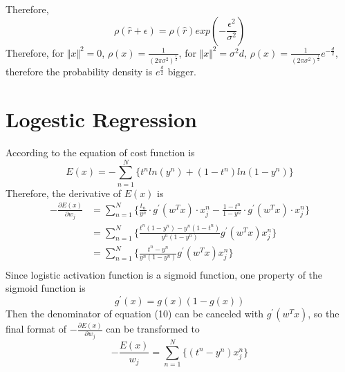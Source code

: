 \documentclass{article} %
\begin{document}
Therefore,
\begin{equation}
    \rho(\hat{r}+\epsilon) = \rho(\hat{r})exp(-\frac{\epsilon^2}{\sigma^2})
\end{equation}
Therefore, for $\Vert x \Vert^2=0$, $\rho(x) = \frac{1}{(2\pi\sigma^2)^{\frac{1}{2}}}$, for $\Vert x \Vert^2=\sigma^2d$, $\rho(x) = \frac{1}{(2\pi\sigma^2)^{\frac{1}{2}}}e^{-\frac{d}{2}}$, therefore the probability density is $e^{\frac{d}{2}}$  bigger.
\section{Logestic Regression}
According to the equation of cost function is
\begin{equation}
E(x) = -\sum_{n=1}^N\{t^nln(y^n)+(1-t^n)ln(1-y^n)\}
\end{equation}
Therefore, the derivative of $E(x)$ is
\begin{equation}
\begin{split}
-\frac{\partial E(x)}{\partial w_j} &= \sum_{n=1}^N\{\frac{t_n}{y^n}\cdot g^{'}(w^Tx)\cdot x_j^n - \frac{1-t^n}{1-y^n}\cdot g^{'}(w^Tx)\cdot x_j^n\}\\
&=\sum_{n=1}^N\{\frac{t^n(1-y^n)-y^n(1-t^n)}{y^n(1-y^n)}g^{'}(w^Tx)x_j^n\}\\
&=\sum_{n=1}^N\{\frac{t^n-y^n}{y^n(1-y^n)}g^{'}(w^Tx)x_j^n\}\\
\end{split}
\end{equation}
Since logistic activation function is a sigmoid function, one property of the sigmoid function is
\begin{equation}
    g^{'}(x) = g(x)(1-g(x))
\end{equation}
Then the denominator of equation (10) can be canceled with $g^{'}(w^Tx)$, so the final format of $-\frac{\partial E(x)}{\partial w_j}$ can be transformed to 
\begin{equation}
-\frac{E(x)}{w_j} = \sum_{n=1}^N\{ (t^n-y^n)x_j^n\}
\end{equation}
\end{document}
